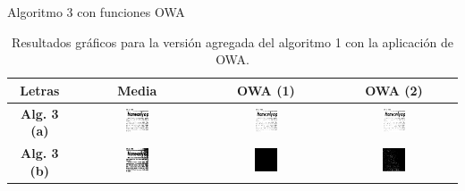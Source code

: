 \documentclass{beamer}
\theoremstyle{plain} %
\theoremstyle{definition}
\newcommand{\bb}{\bfseries}
\begin{document}
\begin{frame}{Algoritmo 3 con funciones OWA}
  \begin{table}
  \centering
  \begin{tabular}{c||c|c|c}
Letras                               &\bb Media&\bb OWA (1)&\bb OWA (2)\\\hline\hline
\bb Alg. 3 (a)  &  
\includegraphics[width=0.2\textwidth]{img/res/e7/alg3aowa109.jpg} &
\includegraphics[width=0.2\textwidth]{img/res/e7/alg3aowa209.jpg} &
\includegraphics[width=0.2\textwidth]{img/res/e7/alg3aowa309.jpg} \\
\bb Alg. 3 (b)  &   
\includegraphics[width=0.2\textwidth]{img/res/e7/alg3bowa109.jpg} &
\includegraphics[width=0.2\textwidth]{img/res/e7/alg3bowa209.jpg} &
\includegraphics[width=0.2\textwidth]{img/res/e7/alg3bowa309.jpg} \\\hline
  \end{tabular}
  \caption{Resultados gráficos para la versión agregada del algoritmo 1 con la aplicación de OWA.}
  \end{table}
\end{frame}
\end{document}
